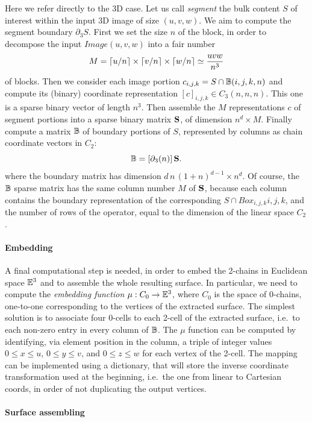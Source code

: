 \documentclass[11pt, oneside]{amsart}   	%
\begin{document}
Here we refer directly to the 3D case.
Let us call \emph{segment} the bulk content $S$ of interest within the input 3D image of size $(u,v,w)$. We aim to compute the segment boundary $\partial_3 S$. 
First we set the size $n$ of the block, in order to decompose the input $Image(u,v,w)$ into a fair number 
\[
M = \left\lceil u/n \right\rceil \times \left\lceil v/n \right\rceil \times \left\lceil w/n \right\rceil \simeq \frac{uvw}{n^3}
\] of blocks. 
Then we consider each image portion $c_{i,j,k} = S\cap \mathbb{B}(i,j,k,n)$ and compute its (binary) coordinate representation  $[c]_{i,j,k}\in C_3(n,n,n)$. This one is a sparse binary vector of length $n^3$. Then assemble the $M$ representations $c$ of segment portions into a sparse binary matrix ${\bf S}$, of dimension $n^d \times M$. Finally compute a matrix ${\bf \mathbb{B}}$ of boundary portions of $S$, represented by columns as chain coordinate vectors in $C_2$:
\[
{\bf \mathbb{B}} = [\partial_3(n)]\, {\bf S}.
\]
where the boundary matrix has dimension $d\,n\,(1+n)^{d-1} \times n^d$.
Of course, the ${\bf \mathbb{B}}$ sparse matrix has the same column number $M$ of ${\bf S}$, because each column contains the boundary representation of the corresponding $S\cap Box_{i,j,k}{i,j,k}$, and the number of rows of the operator, equal to the dimension of the linear space $C_2$.

\paragraph{Embedding}
A final computational step is needed, in order to embed the 2-chains in Euclidean space $\mathbb{E}^3$ and to assemble the whole resulting surface. In particular, we need to compute the \emph{embedding function} $\mu : C_0 \to \mathbb{E}^3$, where $C_0$ is the space of 0-chains, one-to-one corresponding to the vertices of the extracted surface. The simplest solution is to associate  four 0-cells to each 2-cell of the extracted surface, i.e.~to each non-zero entry in every column of ${\bf \mathbb{B}}$.  The $\mu$ function  can be computed by identifying, via  element position in the column, a triple of integer values $0\leq x\leq u$, $0\leq y\leq v$, and $0\leq z\leq w$ for each vertex of the 2-cell.  The mapping can be implemented using a dictionary, that will store the inverse coordinate transformation used at the beginning, i.e.~the one from linear to Cartesian coords, in order of not duplicating the output vertices.   

\paragraph{Surface assembling}
\end{document}
